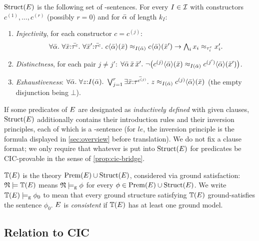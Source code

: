 \begin{definition}
  \label{def:struct}
  $\mathrm{Struct}(E)$ is the following set of \Frag-sentences.
  For every $I \in \mathcal{I}$ with constructors $c^{(1)},\dots,c^{(r)}$ (possibly
  $r=0$) and for $\bar{\alpha}$ of length $k_I$:
  \begin{enumerate}[label=(S\arabic*)]
  \item \emph{Injectivity}, for each constructor $c = c^{(j)}$:
    \[
      \forall\bar{\alpha}.\ \forall \bar{x}{:}\bar{\tau^c}.\ \forall
      \bar{x}'{:}\bar{\tau^c}.\
      c\langle\bar{\alpha}\rangle(\bar{x}) \approx_{I(\bar{\alpha})}
      c\langle\bar{\alpha}\rangle(\bar{x}')
      \rightarrow \textstyle\bigwedge_i x_i \approx_{\tau^c_i} x'_i .
    \]
  \item \emph{Distinctness}, for each pair $j \neq j'$:
    $\forall\tup\alpha\,\tup x\,\tup x'.\ \neg\bigl(
    c^{(j)}\langle\tup\alpha\rangle(\tup x) \eqx{I(\tup\alpha)}
    c^{(j')}\langle\tup\alpha\rangle(\tup x')\bigr)$.
  \item \emph{Exhaustiveness}:
    $\forall\bar{\alpha}.\ \forall z{:}I(\bar{\alpha}).\
    \bigvee_{j=1}^{r} \exists \bar{x}{:}\bar{\tau^{c^{(j)}}}.\
    z \approx_{I(\bar{\alpha})} c^{(j)}\langle\bar{\alpha}\rangle(\bar{x})$
    \quad (the empty disjunction being $\bot$).
  \end{enumerate}
  If some predicates of $E$ are designated as \emph{inductively defined}
  with given clauses, $\mathrm{Struct}(E)$ additionally contains their introduction
  rules and their inversion principles, each of which is a \Frag-sentence
  (for $\mathit{le}$, the inversion principle is the formula displayed in
  \cref{sec:overview} before translation).  We do not fix a clause format;
  we only require that whatever is put into $\mathrm{Struct}(E)$ for predicates be
  CIC-provable in the sense of \cref{prop:cic-bridge}.
\end{definition}

\begin{definition}
  \label{def:companion}
  $\mathbb{T}(E)$ is the theory $\mathrm{Prem}(E) \cup \mathrm{Struct}(E)$, considered via
  ground satisfaction: $\mathfrak{N} \models \mathbb{T}(E)$ means $\mathfrak{N} \models_{\mathrm{g}} \phi$ for every
  $\phi \in \mathrm{Prem}(E) \cup \mathrm{Struct}(E)$.  We write
  $\mathbb{T}(E) \models_{\mathrm{g}} \phi_0$ to mean that every ground structure satisfying $\mathbb{T}(E)$
  ground-satisfies the sentence $\phi_0$.  $E$ is \emph{consistent} if
  $\mathbb{T}(E)$ has at least one ground model.
\end{definition}

\subsection{Relation to CIC}
\label{subsec:cic}

